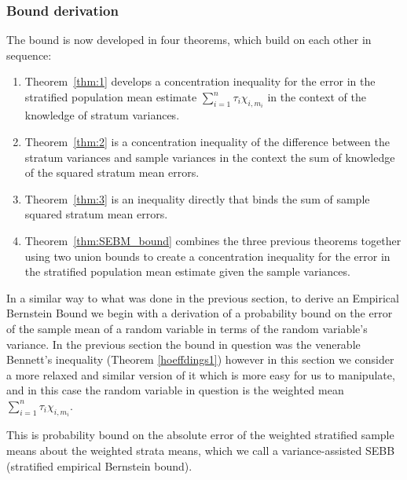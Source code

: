 \subsubsection{Bound derivation}
The bound is now developed in four theorems, 
which build on each other in sequence:
\begin{enumerate}
    \item Theorem~\ref{thm:1} develops a concentration inequality for the error in the stratified population mean estimate $\sum_{i=1}^n\tau_i\chi_{i,m_i}$ in the context of the knowledge of stratum variances.
    \item Theorem~\ref{thm:2} is a concentration inequality of the difference between the stratum variances and sample variances in the context the sum of knowledge of the squared stratum mean errors.
    \item Theorem~\ref{thm:3} is an inequality directly that binds the sum of sample squared stratum mean errors.
    \item Theorem~\ref{thm:SEBM_bound} combines the three previous theorems together using two union bounds to create a concentration inequality for the error in the stratified population mean estimate given the sample variances.
\end{enumerate}

In a similar way to what was done in the previous section, to derive an Empirical Bernstein Bound we begin with a derivation of a probability bound on the error of the sample mean of a random variable in terms of the random variable's variance.
In the previous section the bound in question was the venerable Bennett's inequality (Theorem \ref{hoeffdings1}) however in this section we consider a more relaxed and similar version of it which is more easy for us to manipulate, and in this case the random variable in question is the weighted mean $\sum_{i=1}^n\tau_i\chi_{i,m_i}$.

This is probability bound on the absolute error of the weighted stratified sample means about the weighted strata means, which we call a variance-assisted SEBB (stratified empirical Bernstein bound).


